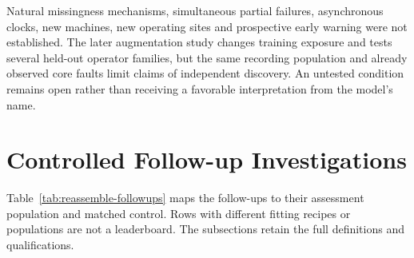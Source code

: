 Natural missingness mechanisms, simultaneous partial failures, asynchronous clocks, new
machines, new operating sites and prospective early warning were not established. The
later augmentation study changes training exposure and tests several held-out operator
families, but the same recording population and already observed core faults limit
claims of independent discovery. An untested condition remains open rather than
receiving a favorable interpretation from the model's name.

\section{Controlled Follow-up Investigations}
\label{sec:reassemble-followups}
Table~\ref{tab:reassemble-followups} maps the follow-ups to their assessment population
and matched control. Rows with different fitting recipes or populations are not a
leaderboard. The subsections retain the full definitions and qualifications.

